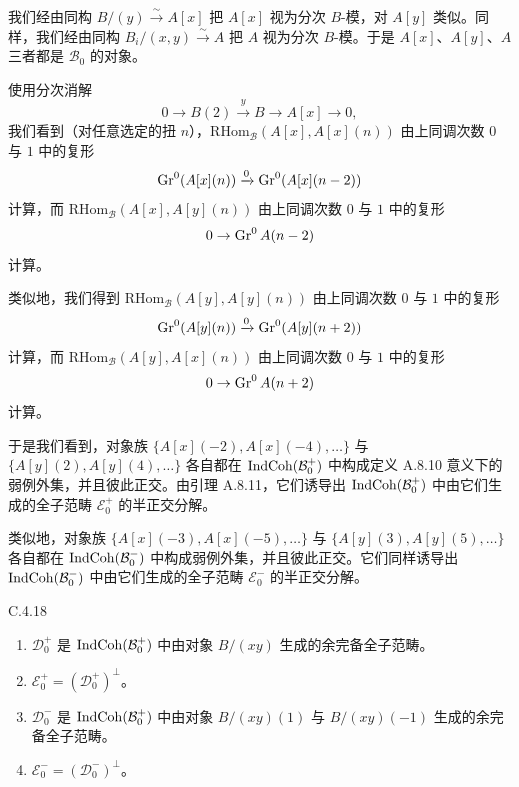 
我们经由同构 $B/(y)\xrightarrow{\sim}A[x]$ 把 $A[x]$ 视为分次 $B$-模，对 $A[y]$ 类似。同样，我们经由同构 $B_i/(x,y)\xrightarrow{\sim}A$ 把 $A$ 视为分次 $B$-模。于是 $A[x]$、$A[y]$、$A$ 三者都是 $\mathcal B_0$ 的对象。

使用分次消解
\begin{equation}\tag{C.4.17}\label{eq:a4-19-8}
0\to B(2)\xrightarrow{y}B\to A[x]\to0,
\end{equation}
我们看到（对任意选定的扭 $n$），$\mathrm{RHom}_{\mathcal B}(A[x],A[x](n))$ 由上同调次数 $0$ 与 $1$ 中的复形
\[
\operatorname{Gr}^0(A[x](n))\xrightarrow{0}\operatorname{Gr}^0(A[x](n-2))
\]
计算，而 $\mathrm{RHom}_{\mathcal B}(A[x],A[y](n))$ 由上同调次数 $0$ 与 $1$ 中的复形
\[
0\to\operatorname{Gr}^0A(n-2)
\]
计算。

类似地，我们得到 $\mathrm{RHom}_{\mathcal B}(A[y],A[y](n))$ 由上同调次数 $0$ 与 $1$ 中的复形
\[
\operatorname{Gr}^0(A[y](n))\xrightarrow{0}\operatorname{Gr}^0(A[y](n+2))
\]
计算，而 $\mathrm{RHom}_{\mathcal B}(A[y],A[x](n))$ 由上同调次数 $0$ 与 $1$ 中的复形
\[
0\to\operatorname{Gr}^0A(n+2)
\]
计算。

于是我们看到，对象族 $\{A[x](-2),A[x](-4),\dots\}$ 与 $\{A[y](2),A[y](4),\dots\}$ 各自都在 $\operatorname{IndCoh}(\mathcal B_0^+)$ 中构成定义 A.8.10 意义下的弱例外集，并且彼此正交。由引理 A.8.11，它们诱导出 $\operatorname{IndCoh}(\mathcal B_0^+)$ 中由它们生成的全子范畴 $\mathcal E_0^+$ 的半正交分解。

类似地，对象族 $\{A[x](-3),A[x](-5),\dots\}$ 与 $\{A[y](3),A[y](5),\dots\}$ 各自都在 $\operatorname{IndCoh}(\mathcal B_0^-)$ 中构成弱例外集，并且彼此正交。它们同样诱导出 $\operatorname{IndCoh}(\mathcal B_0^-)$ 中由它们生成的全子范畴 $\mathcal E_0^-$ 的半正交分解。

\begin{prop}{C.4.18}\label{thm:a4-19-18}
\begin{enumerate}[label=(\arabic*)]
\item $\mathcal D_0^+$ 是 $\operatorname{IndCoh}(\mathcal B_0^+)$ 中由对象 $B/(xy)$ 生成的余完备全子范畴。
\item $\mathcal E_0^+=(\mathcal D_0^+)^{\perp}$。
\item $\mathcal D_0^-$ 是 $\operatorname{IndCoh}(\mathcal B_0^+)$ 中由对象 $B/(xy)(1)$ 与 $B/(xy)(-1)$ 生成的余完备全子范畴。
\item $\mathcal E_0^-=(\mathcal D_0^-)^{\perp}$。
\end{enumerate}
\end{prop}

